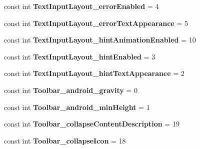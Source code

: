 \begin{DoxyCompactItemize}
const int {\bfseries Text\+Input\+Layout\+\_\+error\+Enabled} = 4
\item 
\mbox{\label{class_pinned_app_1_1_droid_1_1_resource_1_1_styleable_a031bce86f821a95181e14d2dea7aff8b}} 
const int {\bfseries Text\+Input\+Layout\+\_\+error\+Text\+Appearance} = 5
\item 
\mbox{\label{class_pinned_app_1_1_droid_1_1_resource_1_1_styleable_a3293884b7168b870a672a6fcffc2613f}} 
const int {\bfseries Text\+Input\+Layout\+\_\+hint\+Animation\+Enabled} = 10
\item 
\mbox{\label{class_pinned_app_1_1_droid_1_1_resource_1_1_styleable_a30c8d8120fc4c23607ab3b6c7a77c992}} 
const int {\bfseries Text\+Input\+Layout\+\_\+hint\+Enabled} = 3
\item 
\mbox{\label{class_pinned_app_1_1_droid_1_1_resource_1_1_styleable_a25015dbbf0afb0caefb363b2f029b77f}} 
const int {\bfseries Text\+Input\+Layout\+\_\+hint\+Text\+Appearance} = 2
\item 
\mbox{\label{class_pinned_app_1_1_droid_1_1_resource_1_1_styleable_a998f63e406c7f38b8659f51d4c7bd708}} 
const int {\bfseries Toolbar\+\_\+android\+\_\+gravity} = 0
\item 
\mbox{\label{class_pinned_app_1_1_droid_1_1_resource_1_1_styleable_a108c1e351682a56d27ddb7cec7c1a108}} 
const int {\bfseries Toolbar\+\_\+android\+\_\+min\+Height} = 1
\item 
\mbox{\label{class_pinned_app_1_1_droid_1_1_resource_1_1_styleable_a4b30a2c9459d61325babd80c8ab3b8ab}} 
const int {\bfseries Toolbar\+\_\+collapse\+Content\+Description} = 19
\item 
\mbox{\label{class_pinned_app_1_1_droid_1_1_resource_1_1_styleable_a72df6d1d2879f1e54ab8cb6025e1e656}} 
const int {\bfseries Toolbar\+\_\+collapse\+Icon} = 18

\end{DoxyCompactItemize}
